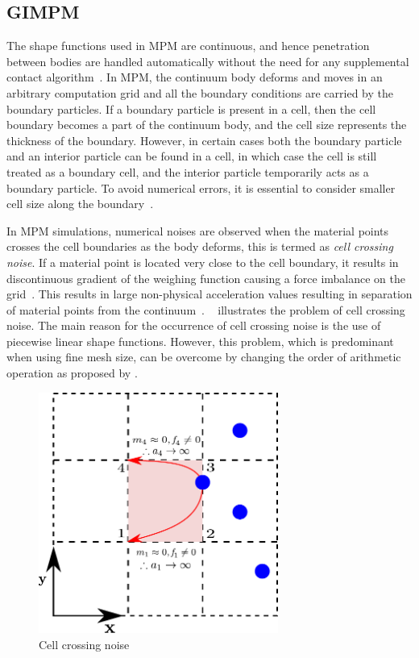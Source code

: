 \subsection{GIMPM}

The shape functions used in MPM are continuous, and hence penetration between 
bodies are handled 
automatically without the need for any supplemental contact 
algorithm~\citep{Chen2002}. In MPM, the continuum body deforms and moves in 
an arbitrary computation grid and all the boundary conditions are carried by 
the boundary particles. If a boundary particle is present in a cell, then the 
cell boundary becomes a part of the continuum body, and the cell size 
represents the thickness of the boundary. However, in certain cases both the 
boundary particle and an interior particle can be found in a cell, in which 
case the cell is still treated as a boundary cell, and the interior particle 
temporarily acts as a boundary particle. To avoid numerical errors, it is 
essential to consider smaller cell size along the boundary~\citep{Chen2002}. 

In MPM simulations, numerical noises are observed when the material points 
crosses the cell boundaries as the body deforms, this is termed 
as \textit{cell crossing noise}. If a material point is located very close to 
the cell boundary, it results in discontinuous gradient of the weighing 
function causing a force imbalance on the grid~\citep{bardenhagen2004}. This 
results in large non-physical acceleration values resulting in separation of 
material points from the continuum~\citep{Sulsky1995}. 
~ illustrates the problem of cell crossing noise. The 
main reason for the occurrence of cell crossing noise is the use of piecewise 
linear shape functions. However, this problem, which is predominant when using 
fine mesh size, can be overcome by changing the order of arithmetic operation 
as proposed by \citet{Sulsky1995}. 

\begin{figure}[htbp]
\centering
\includegraphics[width=0.7\textwidth]{cellnoise}
\caption{Cell crossing noise}
\label{fig:cellnoise}
\end{figure}

